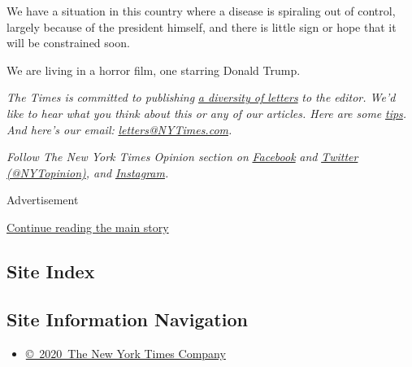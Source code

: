 We have a situation in this country where a disease is spiraling out of
control, largely because of the president himself, and there is little
sign or hope that it will be constrained soon.

We are living in a horror film, one starring Donald Trump.

\emph{The Times is committed to publishing}
\href{https://www.nytimes3xbfgragh.onion/2019/01/31/opinion/letters/letters-to-editor-new-york-times-women.html}{\emph{a
diversity of letters}} \emph{to the editor. We'd like to hear what you
think about this or any of our articles. Here are some}
\href{https://help.nytimes3xbfgragh.onion/hc/en-us/articles/115014925288-How-to-submit-a-letter-to-the-editor}{\emph{tips}}\emph{.
And here's our email:}
\href{mailto:letters@NYTimes.com}{\emph{letters@NYTimes.com}}\emph{.}

\emph{Follow The New York Times Opinion section on}
\href{https://www.facebookcorewwwi.onion/nytopinion}{\emph{Facebook}}
\emph{and} \href{http://twitter.com/NYTOpinion}{\emph{Twitter
(@NYTopinion)}}\emph{, and}
\href{https://www.instagram.com/nytopinion/}{\emph{Instagram}}\emph{.}

Advertisement

\protect\hyperlink{after-bottom}{Continue reading the main story}

\hypertarget{site-index}{%
\subsection{Site Index}\label{site-index}}

\hypertarget{site-information-navigation}{%
\subsection{Site Information
Navigation}\label{site-information-navigation}}

\begin{itemize}
\tightlist
\item
  \href{https://help.nytimes3xbfgragh.onion/hc/en-us/articles/115014792127-Copyright-notice}{©~2020~The
  New York Times Company}
\end{itemize}

